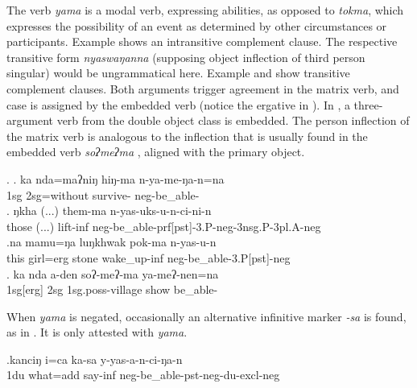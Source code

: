 The verb \emph{yama} is a modal verb, expressing abilities, as opposed to \emph{tokma}, which expresses the possibility of an event as determined by other circumstances or participants. Example \Next[a] shows an intransitive complement clause. The respective transitive form \emph{nyaswaŋanna} (supposing  object inflection of third person singular) would be ungrammatical here. Example \Next[b] and \Next[c] show transitive complement clauses.  Both arguments trigger agreement in the matrix verb, and case is assigned by the embedded verb (notice the ergative in \Next[c]). In \Next[d], a three-argument verb from the double object class is embedded. The person inflection of the matrix verb is analogous to the inflection that is usually found in the embedded verb  \emph{soʔmeʔma} , aligned with the primary object.

\ex. \ag. ka nda=maʔniŋ hiŋ-ma n-ya-me-ŋa-n=na\\  
	 {\sc 1sg} {\sc 2sg=}without survive-  {\sc neg-}be\_able-\\
\bg. ŋkha (...) them-ma     n-yas-uks-u-n-ci-ni-n\\
those (...) lift{\sc -inf} {\sc neg-}be\_able{\sc -prf[pst]-3.P-neg-3nsg.P-3pl.A-neg}\\
\bg.na   mamu=ŋa   luŋkhwak pok-ma        n-yas-u-n\\
this girl{\sc =erg} stone wake\_up{\sc -inf} {\sc neg-}be\_able{\sc [3sg.A]-3.P[pst]-neg}\\
 
	\bg. ka nda a-den soʔ-meʔ-ma ya-meʔ-nen=na\\
	{\sc 1sg[erg]} {\sc 2sg} {\sc 1sg.poss}-village  show be\_able-\\
	
When  \emph{yama} is negated, occasionally an alternative infinitive marker \emph{-sa} is found, as in \Next. It is only attested with \emph{yama}.

\exg.kanciŋ  i=ca ka-sa y-yas-a-n-ci-ŋa-n\\
{\sc 1du} what{\sc =add} say{\sc -inf} {\sc neg-}be\_able{\sc -pst-neg-du-excl-neg}\\
 


